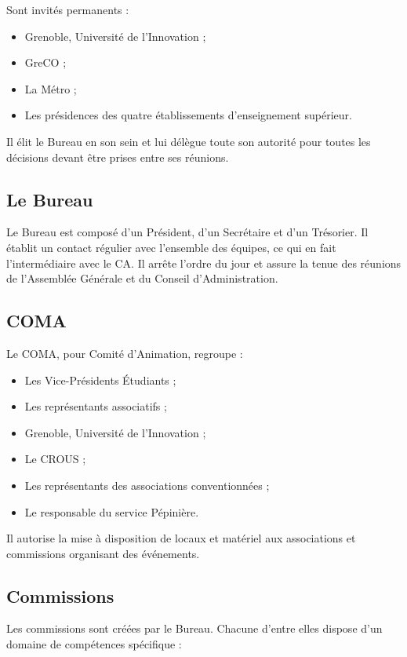 Sont invités permanents :

\begin{itemize}
\item Grenoble, Université de l'Innovation ;
\item GreCO ;
\item La Métro ;
\item Les présidences des quatre établissements d'enseignement supérieur.
\end{itemize}

Il élit le Bureau en son sein et lui délègue toute son autorité pour toutes les décisions devant être prises entre ses réunions.

\subsection{Le Bureau}
\label{bureau}

Le Bureau est composé d'un Président, d'un Secrétaire et d'un Trésorier.
Il établit un contact régulier avec l'ensemble des équipes, ce qui en fait l'intermédiaire avec le CA. Il arrête l'ordre du jour et assure la tenue des réunions de l'Assemblée Générale et du Conseil d'Administration.

\subsection{COMA}

Le COMA, pour Comité d'Animation, regroupe :

\begin{itemize}
\item Les Vice-Présidents Étudiants ;
\item Les représentants associatifs ;
\item Grenoble, Université de l'Innovation ;
\item Le CROUS ;
\item Les représentants des associations conventionnées ;
\item Le responsable du service Pépinière.
\end{itemize}

Il autorise la mise à disposition de locaux et matériel aux associations
et commissions organisant des événements.

\subsection{Commissions}

Les commissions sont créées par le Bureau.
Chacune d'entre elles dispose d'un domaine de compétences spécifique :

